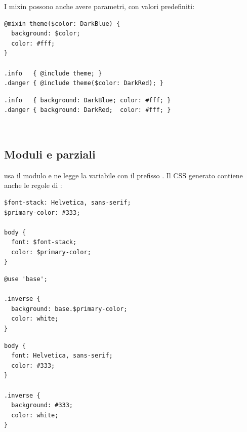 I mixin possono anche avere parametri, con valori predefiniti:

\begin{affianco}[0.5]
\begin{lstlisting}[style=css, name=theme.scss]
@mixin theme($color: DarkBlue) {
  background: $color;
  color: #fff;
}

.info   { @include theme; }
.danger { @include theme($color: DarkRed); }
\end{lstlisting}
\risultato
\begin{lstlisting}[style=css, name=CSS generato]
.info   { background: DarkBlue; color: #fff; }
.danger { background: DarkRed;  color: #fff; }
\end{lstlisting}
\begin{browser}[theme]
  \colorbox{css-darkblue}{}\\[3pt]
  \colorbox{css-darkred}{}
\end{browser}
\end{affianco}

\subsection{Moduli e parziali}

 usa il modulo  e ne legge la variabile con il
prefisso . Il CSS generato contiene anche le regole di :

\begin{affianco}[0.5]
\begin{lstlisting}[style=css, name=base.scss]
$font-stack: Helvetica, sans-serif;
$primary-color: #333;

body {
  font: $font-stack;
  color: $primary-color;
}
\end{lstlisting}
\risultato
\begin{lstlisting}[style=css, name=example.scss]
@use 'base';

.inverse {
  background: base.$primary-color;
  color: white;
}
\end{lstlisting}
\begin{lstlisting}[style=css, name=CSS generato]
body {
  font: Helvetica, sans-serif;
  color: #333;
}

.inverse {
  background: #333;
  color: white;
}
\end{lstlisting}
\end{affianco}

